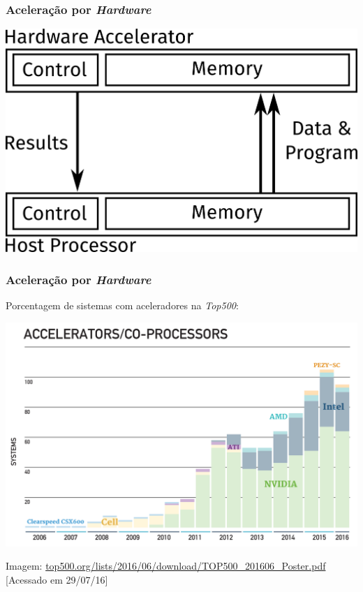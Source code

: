 \documentclass[10pt, compress]{beamer}
\begin{document}
\begin{frame}
    \frametitle{Aceleração por \textit{Hardware}}
    \centering
    \includegraphics[width=.8\textwidth]{accel}
\end{frame}

\begin{frame}
    \frametitle{Aceleração por \textit{Hardware}}
    Porcentagem de sistemas com aceleradores na \textit{Top500}:

    \begin{center}
    \includegraphics[width=.95\textwidth]{top500_accel}
    \hfill

        \tiny{Imagem: \url{top500.org/lists/2016/06/download/TOP500_201606_Poster.pdf} [Acessado em 29/07/16]}
    \end{center}
\end{frame}
\end{document}
